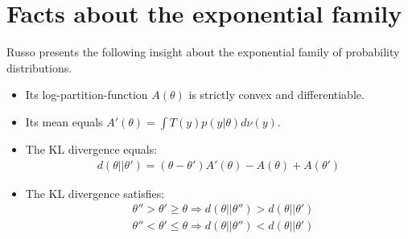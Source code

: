 \section{Facts about the exponential family}
Russo presents the following insight about the exponential family of probability distributions.
\begin{itemize}
  \item Its log-partition-function $A(\theta)$ is strictly convex and differentiable.
  \item Its mean equals $A'(\theta) = \int T(y)p(y|\theta)d\nu(y)$.
  \item The KL divergence equals:
    \begin{align}
        d(\theta||\theta') = (\theta - \theta')A'(\theta) - A(\theta) + A(\theta')\label{eq:exponential_kl}
    \end{align}
  \item The KL divergence satisfies:
    \begin{align}
      &\theta'' > \theta' \geq \theta \Rightarrow d(\theta||\theta'') > d(\theta||\theta') \label{eq:kl_monotonicity}\\
      &\theta'' < \theta' \leq \theta \Rightarrow d(\theta||\theta'') < d(\theta||\theta')
    \end{align}
\end{itemize}

